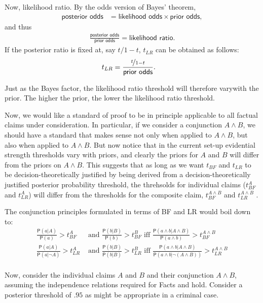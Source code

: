 \documentclass[
  10pt,
  dvipsnames,enabledeprecatedfontcommands]{scrartcl}
\newcommand{\ali}[1]{\todo[color=gray!40]{\textbf{Alicja:} #1}}
\newcommand{\n}{\neg}
\newcommand{\et}{\wedge}
\newcommand{\pr}[1]{\mathsf{P}(#1)}
\begin{document}
Now, likelihood ratio. By the odds version of Bayes' theorem,
\begin{align*}
\textsf{posterior odds} & = \textsf{likelihood odds} \times \textsf{prior odds},
\end{align*} and thus
\begin{align*}\frac{\textsf{posterior odds}}{\textsf{prior odds}} = \textsf{likelihood ratio}.
\end{align*} If the posterior ratio is fixed at, say \(t/1-t\),
\(t_{LR}\) can be obtained as follows:
\begin{align*}t_{LR} & = \frac{\nicefrac{t}{1-t}}{\textsf{prior odds}}.
\end{align*}

\noindent Just as the Bayes factor, the likelihood ratio threshold will
therefore varywith the prior. The higher the prior, the lower the
likelihood ratio threshold.

Now, we would like a standard of proof to be in principle applicable to
all factual claims under consideration. In particular, if we consider a
conjunction \(A\et B\), we should have a standard that makes sense not
only when applied to \(A\et B\), but also when applied to \(A \et B\).
But now notice that in the current set-up evidential strength thresholds
vary with priors, and clearly the priors for \(A\) and \(B\) will differ
from the priors on \(A\et B\). This suggests that as long as we want
\(t_{BF}\) and \(t_{LR}\) to be decision-theoretically justified by
being derived from a decision-theoretically justified posterior
probability threshold, the threhsolds for individual claims
(\(t_{BF}^A\) and \(t_{LR}^A\)) will differ from the thresholds for the
composite claim, \(t_{BF}^{A\wedge B}\) and \(t_{LR}^{A\wedge B}\) .

The conjunction principles formulated in terms of BF and LR would boil
down to:
\begin{align*} \frac{\pr{a \vert A }}{\pr{a}}>t^A_{BF} &\mbox{ and } 
\frac{\pr{ b \vert B}}{\pr{b}}>t^B_{BF} \mbox{ iff } 
\frac{\pr{a \et b \vert A \et B}}{\pr{a \et b}}>t^{A\wedge B}_{BF} \\
 \frac{\pr{a \vert A }}{\pr{a \vert \n A}}>t^A_{LR} &\mbox{ and } 
\frac{\pr{ b \vert B}}{\pr{b\vert B}}>t^B_{LR} \mbox{ iff } 
\frac{\pr{a \et b \vert A \et B}}{\pr{a \et b\vert \n (A \et B)}}>t^{A\wedge B}_{LR} \\
\end{align*}

Now, consider the individual claims \(A\) and \(B\) and their
conjunction \(A \wedge B\), assuming the independence relations required
for Facts \ali{REF} and \ali{REF} hold. Consider a posterior threshold
of \(.95\) as might be appropriate in a criminal case.
\end{document}
